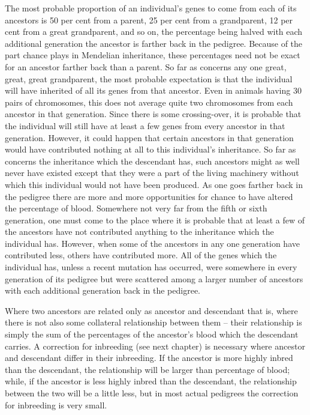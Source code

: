 The most probable proportion of an individual's genes to come
from each of its ancestors is 50 per cent from a parent, 25 per cent from
a grandparent, 12 per cent from a great grandparent, and so on, the
percentage being halved with each additional generation the ancestor
is farther back in the pedigree. Because of the part chance plays in
Mendelian inheritance, these percentages need not be exact for an
ancestor farther back than a parent. So far as concerns any one great,
great, great grandparent, the most probable expectation is that the individual
will have inherited  of all its genes from that ancestor. Even
in animals having 30 pairs of chromosomes, this does not average quite
two chromosomes from each ancestor in that generation. Since there is
some crossing-over, it is probable that the individual will still have at
least a few genes from every ancestor in that generation. However, it
could happen that certain ancestors in that generation would have contributed
nothing at all to this individual's inheritance. So far as concerns
the inheritance which the descendant has, such ancestors might as
well never have existed except that they were a part of the living
machinery without which this individual would not have been produced.
As one goes farther back in the pedigree there are more and more
opportunities for chance to have altered the percentage of blood. Somewhere
not very far from the fifth or sixth generation, one must come to
the place where it is probable that at least a few of the ancestors have
not contributed anything to the inheritance which the individual has.
However, when some of the ancestors in any one generation have contributed
less, others have contributed more. All of the genes which the
individual has, unless a recent mutation has occurred, were somewhere
in every generation of its pedigree but were scattered among a larger
number of ancestors with each additional generation back in the
pedigree.

Where two ancestors are related only as ancestor and descendant that
is, where there is not also some collateral relationship between
them -- their relationship is simply the sum of the percentages of the
ancestor's blood which the descendant carries. A correction for inbreeding
(see next chapter) is necessary where ancestor and descendant differ
in their inbreeding. If the ancestor is more highly inbred than the descendant,
the relationship will be larger than percentage of blood; while,
if the ancestor is less highly inbred than the descendant, the relationship
between the two will be a little less, but in most actual pedigrees
the correction for inbreeding is very small.

